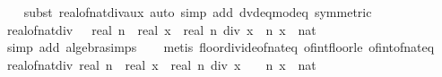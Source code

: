 \begin{isabellebody}
%
\isadelimproof
\ \ %
\endisadelimproof
%
\isatagproof
{}\isamarkupfalse%
\ {\isacharparenleft}{\kern0pt}subst\ real{\isacharunderscore}{\kern0pt}of{\isacharunderscore}{\kern0pt}nat{\isacharunderscore}{\kern0pt}div{\isacharunderscore}{\kern0pt}aux{\isacharparenright}{\kern0pt}\ {\isacharparenleft}{\kern0pt}auto\ simp\ add{\isacharcolon}{\kern0pt}\ dvd{\isacharunderscore}{\kern0pt}eq{\isacharunderscore}{\kern0pt}mod{\isacharunderscore}{\kern0pt}eq{\isacharunderscore}{\kern0pt}{}\ {\isacharbrackleft}{\kern0pt}symmetric{\isacharbrackright}{\kern0pt}{\isacharparenright}{\kern0pt}%
\endisatagproof
{\isafoldproof}%
%
\isadelimproof
\isanewline
%
\endisadelimproof
\isanewline
{}\isamarkupfalse%
\ real{\isacharunderscore}{\kern0pt}of{\isacharunderscore}{\kern0pt}nat{\isacharunderscore}{\kern0pt}div{}{\isacharcolon}{\kern0pt}\ {\isachardoublequoteopen}{}\ {\isasymle}\ real\ n\ {\isacharslash}{\kern0pt}\ real\ x\ {\isacharminus}{\kern0pt}\ real\ {\isacharparenleft}{\kern0pt}n\ div\ x{\isacharparenright}{\kern0pt}{\isachardoublequoteclose}\ \ n\ x\ {\isacharcolon}{\kern0pt}{\isacharcolon}{\kern0pt}\ nat\isanewline
%
\isadelimproof
\ \ %
\endisadelimproof
%
\isatagproof
{}\isamarkupfalse%
\ {\isacharparenleft}{\kern0pt}simp\ add{\isacharcolon}{\kern0pt}\ algebra{\isacharunderscore}{\kern0pt}simps{\isacharparenright}{\kern0pt}\isanewline
\ \ \isamarkupfalse%
\ {\isacharparenleft}{\kern0pt}metis\ floor{\isacharunderscore}{\kern0pt}divide{\isacharunderscore}{\kern0pt}of{\isacharunderscore}{\kern0pt}nat{\isacharunderscore}{\kern0pt}eq\ of{\isacharunderscore}{\kern0pt}int{\isacharunderscore}{\kern0pt}floor{\isacharunderscore}{\kern0pt}le\ of{\isacharunderscore}{\kern0pt}int{\isacharunderscore}{\kern0pt}of{\isacharunderscore}{\kern0pt}nat{\isacharunderscore}{\kern0pt}eq{\isacharparenright}{\kern0pt}%
\endisatagproof
{\isafoldproof}%
%
\isadelimproof
\isanewline
%
\endisadelimproof
\isanewline
{}\isamarkupfalse%
\ real{\isacharunderscore}{\kern0pt}of{\isacharunderscore}{\kern0pt}nat{\isacharunderscore}{\kern0pt}div{}{\isacharcolon}{\kern0pt}\ {\isachardoublequoteopen}real\ n\ {\isacharslash}{\kern0pt}\ real\ x\ {\isacharminus}{\kern0pt}\ real\ {\isacharparenleft}{\kern0pt}n\ div\ x{\isacharparenright}{\kern0pt}\ {\isasymle}\ {}{\isachardoublequoteclose}\ \ n\ x\ {\isacharcolon}{\kern0pt}{\isacharcolon}{\kern0pt}\ nat\isanewline
%
\isadelimproof
%
\endisadelimproof
%
\isatagproof
{}\isamarkupfalse%

\end{isabellebody}
